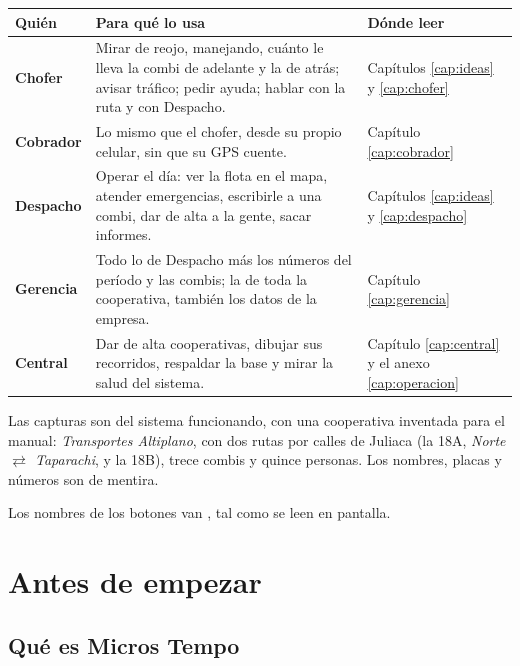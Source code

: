 \documentclass[11pt,a4paper,oneside]{book}
\newcommand{\boton}[1]{\tcbox[on line,boxsep=0pt,left=3pt,right=3pt,top=1.5pt,bottom=1.5pt,
  colback=white,colframe=linea,boxrule=0.5pt,arc=2pt]{\footnotesize\bfseries\color{tinta2}#1}}
\newcommand{\idavuelta}{$\rightleftarrows$}
\begin{document}
\begin{center}
\renewcommand{\arraystretch}{1.35}
\begin{tabularx}{\textwidth}{>{\bfseries}l X >{\raggedright\arraybackslash}p{4.3cm}}
\toprule
\rowcolor{fondo} Quién & Para qué lo usa & Dónde leer \\
\midrule
Chofer & Mirar de reojo, manejando, cuánto le lleva la combi de adelante y la de atrás; avisar tráfico; pedir ayuda; hablar con la ruta y con Despacho. & Capítulos \ref{cap:ideas} y \ref{cap:chofer} \\
Cobrador & Lo mismo que el chofer, desde su propio celular, sin que su GPS cuente. & Capítulo \ref{cap:cobrador} \\
Despacho & Operar el día: ver la flota en el mapa, atender emergencias, escribirle a una combi, dar de alta a la gente, sacar informes. & Capítulos \ref{cap:ideas} y \ref{cap:despacho} \\
Gerencia & Todo lo de Despacho más los números del período y las combis; la de toda la cooperativa, también los datos de la empresa. & Capítulo \ref{cap:gerencia} \\
Central & Dar de alta cooperativas, dibujar sus recorridos, respaldar la base y mirar la salud del sistema. & Capítulo \ref{cap:central} y el anexo \ref{cap:operacion} \\
\bottomrule
\end{tabularx}
\end{center}

Las capturas son del sistema funcionando, con una cooperativa inventada para el
manual: \emph{Transportes Altiplano}, con dos rutas por calles de Juliaca
(la 18A, \emph{Norte \idavuelta{} Taparachi}, y la 18B), trece combis y quince
personas. Los nombres, placas y números son de mentira.

Los nombres de los botones van \boton{ASÍ}, tal como se leen en pantalla.

\tableofcontents

\mainmatter

\chapter{Antes de empezar}
\label{cap:antes}

\section{Qué es Micros Tempo}
\end{document}
